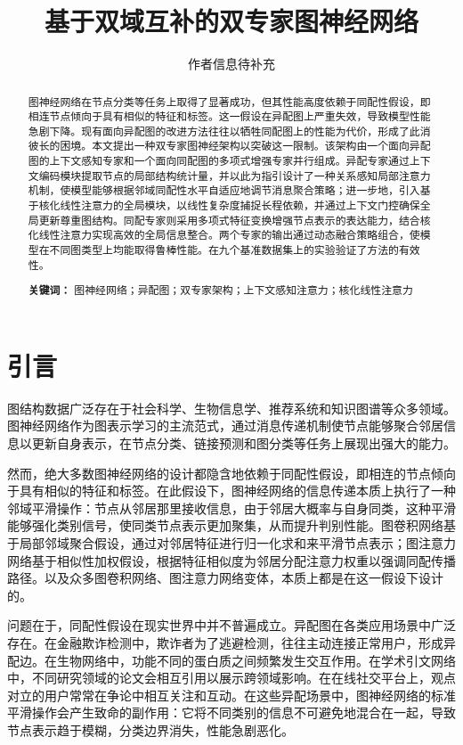 \documentclass[a4paper,10pt]{article}
\title{\textbf{基于双域互补的双专家图神经网络}}
\author{作者信息待补充}
\date{}
\begin{document}
\maketitle

\begin{abstract}
图神经网络在节点分类等任务上取得了显著成功，但其性能高度依赖于同配性假设，即相连节点倾向于具有相似的特征和标签。这一假设在异配图上严重失效，导致模型性能急剧下降。现有面向异配图的改进方法往往以牺牲同配图上的性能为代价，形成了此消彼长的困境。本文提出一种双专家图神经架构以突破这一限制。该架构由一个面向异配图的上下文感知专家和一个面向同配图的多项式增强专家并行组成。异配专家通过上下文编码模块提取节点的局部结构统计量，并以此为指引设计了一种关系感知局部注意力机制，使模型能够根据邻域同配性水平自适应地调节消息聚合策略；进一步地，引入基于核化线性注意力的全局模块，以线性复杂度捕捉长程依赖，并通过上下文门控确保全局更新尊重图结构。同配专家则采用多项式特征变换增强节点表示的表达能力，结合核化线性注意力实现高效的全局信息整合。两个专家的输出通过动态融合策略组合，使模型在不同图类型上均能取得鲁棒性能。在九个基准数据集上的实验验证了方法的有效性。

\textbf{关键词：} 图神经网络；异配图；双专家架构；上下文感知注意力；核化线性注意力
\end{abstract}

\section{引言}

图结构数据广泛存在于社会科学、生物信息学、推荐系统和知识图谱等众多领域。图神经网络作为图表示学习的主流范式，通过消息传递机制使节点能够聚合邻居信息以更新自身表示，在节点分类、链接预测和图分类等任务上展现出强大的能力。

然而，绝大多数图神经网络的设计都隐含地依赖于同配性假设，即相连的节点倾向于具有相似的特征和标签。在此假设下，图神经网络的信息传递本质上执行了一种邻域平滑操作：节点从邻居那里接收信息，由于邻居大概率与自身同类，这种平滑能够强化类别信号，使同类节点表示更加聚集，从而提升判别性能。图卷积网络\cite{gcn}基于局部邻域聚合假设，通过对邻居特征进行归一化求和来平滑节点表示；图注意力网络\cite{gat}基于相似性加权假设，根据特征相似度为邻居分配注意力权重以强调同配传播路径。以及众多图卷积网络、图注意力网络变体，本质上都是在这一假设下设计的。

问题在于，同配性假设在现实世界中并不普遍成立。异配图在各类应用场景中广泛存在。在金融欺诈检测中，欺诈者为了逃避检测，往往主动连接正常用户，形成异配边。在生物网络中，功能不同的蛋白质之间频繁发生交互作用。在学术引文网络中，不同研究领域的论文会相互引用以展示跨领域影响。在在线社交平台上，观点对立的用户常常在争论中相互关注和互动。在这些异配场景中，图神经网络的标准平滑操作会产生致命的副作用：它将不同类别的信息不可避免地混合在一起，导致节点表示趋于模糊，分类边界消失，性能急剧恶化。
\end{document}
